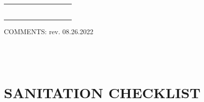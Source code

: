 \documentclass{sop_class}[overrideChapters] %
\begin{document}
{\begin{landscape}
\begin{table}[!htbp]
\begin{threeparttable}
\begin{tabular}{|c|c|c|c|c|c|c|c|c|c|}
            {} & {} & {} & {} & {} & {} & {} & {} & {} & {}\\
            \hline
            {} & {} & {} & {} & {} & {} & {} & {} & {} & {}\\
            \hline
            {} & {} & {} & {} & {} & {} & {} & {} & {} & {}\\
            \hline
            {} & {} & {} & {} & {} & {} & {} & {} & {} & {}\\
            \hline
            {} & {} & {} & {} & {} & {} & {} & {} & {} & {}\\
            \hline
            {} & {} & {} & {} & {} & {} & {} & {} & {} & {}\\
            \hline
            {} & {} & {} & {} & {} & {} & {} & {} & {} & {}\\
            \hline
            \bottomrule
            \end{tabular}
        \begin{tablenotes}
            \small
            \item COMMENTS: \hfill{} rev. 08.26.2022 \\
            \\
            \\
            \\
        \end{tablenotes}
    \end{threeparttable}
\end{table}
 \end{landscape}
\clearpage
\newpage

\section{SANITATION CHECKLIST}\label{sanitation-checklist}
}
\end{document}
